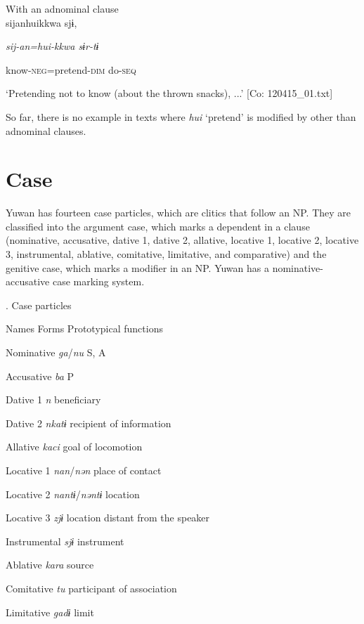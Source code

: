 \ea\label{ex:6-29}
 With an adnominal clause\\

{\TM}
\gll sijanhuikkwa  sjɨ,

    \textit{sij-an=hui{}-kkwa  sɨr-tɨ}

    know-\textsc{neg}=pretend-\textsc{dim}  do-\textsc{seq}

\glt    ‘Pretending not to know (about the thrown snacks), ...’ [Co: 120415\_01.txt]
\z

So far, there is no example in texts where \textit{hui} ‘pretend’ is modified by other than adnominal clauses.

\section{ Case}

Yuwan has fourteen case particles, which are clitics that follow an NP. They are classified into the argument case, which marks a dependent in a clause (nominative, accusative, dative 1, dative 2, allative, locative 1, locative 2, locative 3, instrumental, ablative, comitative, limitative, and comparative) and the genitive case, which marks a modifier in an NP. Yuwan has a nominative-accusative case marking system.

\begin{styleBeschriftung}
\textmd{. Case particles}
\end{styleBeschriftung}

Names  Forms  Prototypical functions

Nominative  \textit{ga}/\textit{nu}  S, A

Accusative  \textit{ba}  P

Dative 1  \textit{n}  beneficiary

Dative 2  \textit{nkatɨ}  recipient of information

Allative  \textit{kaci}  goal of locomotion

Locative 1  \textit{nan}/\textit{nən}  place of contact

Locative 2  \textit{nantɨ}/\textit{nəntɨ}  location

Locative 3  \textit{zjɨ}  location distant from the speaker

Instrumental  \textit{sjɨ}  instrument

Ablative  \textit{kara}  source

Comitative  \textit{tu}  participant of association

Limitative  \textit{gadɨ}  limit

